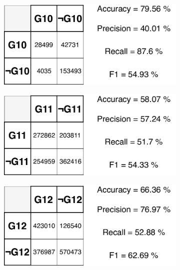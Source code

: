 \begin{figure}[H]
\vspace{3mm}
\begin{subfigure}{.33\textwidth}
  \centering
  \includegraphics[width=\textwidth]{tex/images/results/rese_g10}  
\end{subfigure}%
\begin{subfigure}{.33\textwidth}
  \centering
  \includegraphics[width=\textwidth]{tex/images/results/rese_g11}
\end{subfigure}
\begin{subfigure}{.33\textwidth}
  \centering
  \includegraphics[width=\textwidth]{tex/images/results/rese_g12}
\end{subfigure}


\end{figure}
